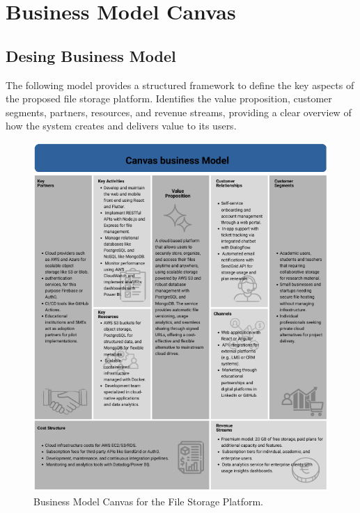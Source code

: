 \section{Business Model Canvas}
\subsection{Desing Business Model}
The following model provides a structured framework to define the key aspects of the proposed file storage platform. Identifies the value proposition, customer segments, partners, resources, and revenue streams, providing a clear overview of how the system creates and delivers value to its users. \\

\begin{figure}[H]
    \centering
    \includegraphics[width=\linewidth,height=0.95\textheight,keepaspectratio]{bussinessmodel/BussinesModel.png}
    \caption{Business Model Canvas for the File Storage Platform.}
    \label{fig:business_model}
\end{figure}
